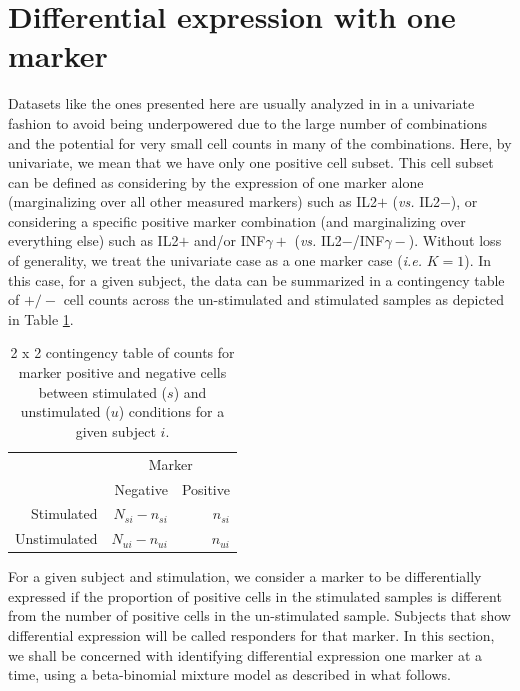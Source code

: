 \documentclass[useAMS,referee,usenatbib]{biom}
\begin{document}
\section{Differential expression with one marker}
\label{s:DEone}
Datasets like the ones presented here are usually analyzed in in a univariate fashion to avoid being underpowered due to the large number of combinations and the potential for very small cell counts in many of the combinations. Here, by univariate, we mean that we have only one positive cell subset. This cell subset can be defined as considering by the expression of one marker alone (marginalizing over all other measured markers) such as IL2$+$ (\textit{vs.} IL2$-$), or considering a specific positive marker combination (and marginalizing over everything else) such as IL2$+$ and/or INF$\gamma+$ (\textit{vs.} IL2$-$/INF$\gamma-$). Without loss of generality, we treat the univariate case as a one marker case (\textit{i.e.} $K=1$). In this case, for a given subject, the data can be summarized in a contingency table of $+/-$ cell counts across the un-stimulated and stimulated samples as depicted in Table \ref{tab:twobytwo}.

\begin{table}
\centering
\parbox{0.8\linewidth}{
\caption{2 x 2 contingency table of counts for marker positive and negative cells between stimulated ($s$) and unstimulated ($u$) conditions for a given subject $i$.}\label{tab:twobytwo}
\centering
\begin{tabular}{rrr}

  \hline
\multicolumn{1}{l}{}&
\multicolumn{2}{c}{Marker}\\
 & Negative & Positive \\ 
  \hline
Stimulated &   $N_{si} - n_{si}$ &   $n_{si}$ \\ 
Unstimulated &   $N_{ui}-n_{ui}$ &   $n_{ui}$ \\ 
   \hline
\end{tabular}
}
\end{table}

For a given subject and stimulation, we consider a marker to be differentially expressed if the proportion of positive cells in the stimulated samples is different from the number of positive cells in the un-stimulated sample. Subjects that show differential expression will be called responders for that marker. In this section, we shall be concerned with identifying differential expression one marker at a time, using a beta-binomial mixture model as described in what follows. 
\end{document}
